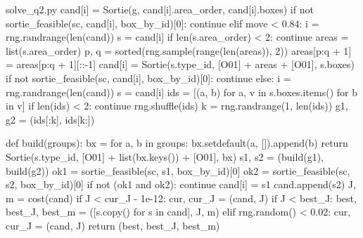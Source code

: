 \documentclass[bwprint]{gmcmthesis}
\begin{document}
\begin{appendices}
\begin{Python}{solve\_q2.py}
            cand[i] = Sortie(g, cand[i].area_order, cand[i].boxes)
            if not sortie_feasible(sc, cand[i], box_by_id)[0]:
                continue
        elif move < 0.84:
            i = rng.randrange(len(cand))
            s = cand[i]
            if len(s.area_order) < 2:
                continue
            areas = list(s.area_order)
            p, q = sorted(rng.sample(range(len(areas)), 2))
            areas[p:q + 1] = areas[p:q + 1][::-1]
            cand[i] = Sortie(s.type_id, [O01] + areas + [O01], s.boxes)
            if not sortie_feasible(sc, cand[i], box_by_id)[0]:
                continue
        else:
            i = rng.randrange(len(cand))
            s = cand[i]
            ids = [(a, b) for a, v in s.boxes.items() for b in v]
            if len(ids) < 2:
                continue
            rng.shuffle(ids)
            k = rng.randrange(1, len(ids))
            g1, g2 = (ids[:k], ids[k:])

            def build(groups):
                bx = {}
                for a, b in groups:
                    bx.setdefault(a, []).append(b)
                return Sortie(s.type_id, [O01] + list(bx.keys()) + [O01], bx)
            s1, s2 = (build(g1), build(g2))
            ok1 = sortie_feasible(sc, s1, box_by_id)[0]
            ok2 = sortie_feasible(sc, s2, box_by_id)[0]
            if not (ok1 and ok2):
                continue
            cand[i] = s1
            cand.append(s2)
        J, m = cost(cand)
        if J < cur_J - 1e-12:
            cur, cur_J = (cand, J)
            if J < best_J:
                best, best_J, best_m = ([s.copy() for s in cand], J, m)
        elif rng.random() < 0.02:
            cur, cur_J = (cand, J)
    return (best, best_J, best_m)


\end{Python}
\end{appendices}
\end{document}
